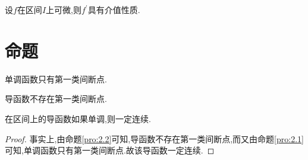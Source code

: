 \documentclass[lang=cn,newtx,10pt,scheme=chinese]{elegantbook}
\begin{document}
\begin{theorem}[$Darboux$定理]\label{Darboux定理}
    设\(f\)在区间\(I\)上可微,则\(f^{\prime}\)具有介值性质.
\end{theorem}


\section{命题}

\begin{proposition}\label{pro:2.1}
单调函数只有第一类间断点.
\end{proposition}

\begin{proposition}\label{pro:2.2}
    导函数不存在第一类间断点.
\end{proposition}

\begin{proposition}\label{pro:2.3}
    在区间上的导函数如果单调,则一定连续.
\end{proposition}
   
\begin{proof}
    事实上,由命题\ref{pro:2.2}可知,导函数不存在第一类间断点,而又由命题\ref{pro:2.1}可知,单调函数只有第一类间断点.故该导函数一定连续.
\end{proof}
\end{document}
